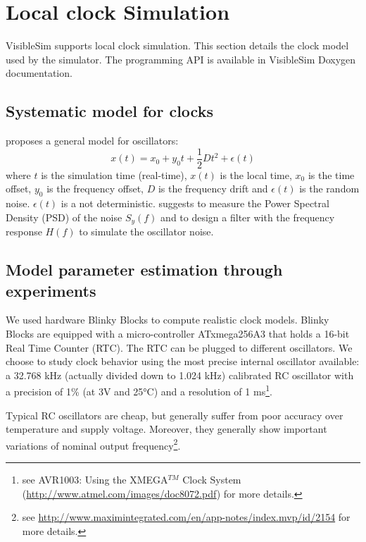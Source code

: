 \documentclass[11pt]{article}
\begin{document}
\section{Local clock Simulation}

VisibleSim supports local clock simulation. This section details the clock model used by the simulator. The programming API is available in VisibleSim Doxygen documentation.

\subsection{Systematic model for clocks}

\cite{allan1987time} proposes a general model for oscillators:
\begin{equation}
x(t) = x_0 + y_0t + \frac{1}{2}Dt^2 + \epsilon(t)
\label{eq:oscillator-model}
\end{equation}
where $t$ is the simulation time (real-time), $x(t)$ is the local time, $x_0$ is the time offset, $y_0$ is the frequency offset, $D$ is the frequency drift and $\epsilon(t)$ is the random noise. $\epsilon(t)$ is a not deterministic. \cite{ring2010clock} suggests to measure the Power Spectral Density (PSD) of the noise $S_y(f)$ and to design a filter with the frequency response $H(f)$ to simulate the oscillator noise.


\subsection{Model parameter estimation through experiments}

We used hardware Blinky Blocks to compute realistic clock models. Blinky Blocks are equipped with a micro-controller ATxmega256A3 that holds a 16-bit Real Time Counter (RTC). The RTC can be plugged to different oscillators. We choose to study clock behavior using the most precise internal oscillator available: a 32.768 kHz (actually divided down to 1.024 kHz) calibrated RC oscillator with a precision of 1\%  (at 3V and 25°C) and a resolution of 1 ms\footnote{see AVR1003: Using the XMEGA$^{TM}$ Clock System (\url{http://www.atmel.com/images/doc8072.pdf}) for more details.}.

Typical RC oscillators are cheap, but generally suffer from poor accuracy over temperature and supply voltage. Moreover, they generally show important variations of nominal output frequency\footnote{see \url{http://www.maximintegrated.com/en/app-notes/index.mvp/id/2154} for more details.}.
\end{document}
